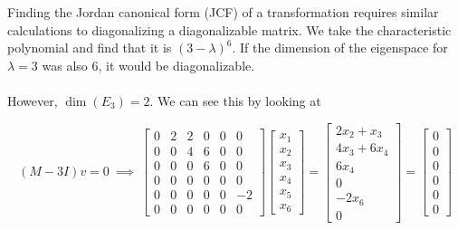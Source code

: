 \documentclass[fontsize=12pt]{scrartcl}
\begin{document}
\noindent
Finding the Jordan canonical form (JCF) of a transformation requires similar calculations to diagonalizing a diagonalizable matrix. We take the characteristic polynomial and find that it is $(3-\lambda)^6$. If the dimension of the eigenspace for $\lambda = 3$ was also 6, it would be diagonalizable.\\
\\
However, $\dim(E_3) = 2$. We can see this by looking at

$$(M- 3I)v = 0 \ \implies \  \begin{bmatrix} 0 & 2 & 2 & 0 & 0 & 0 \\
0 & 0 & 4 & 6 & 0 & 0\\
0 & 0 & 0 & 6 & 0 & 0\\
0 & 0 & 0 & 0 & 0 & 0\\
0 & 0 & 0 & 0 & 0 & -2\\
0 & 0 & 0 & 0 & 0 & 0\end{bmatrix} \begin{bmatrix} x_1 \\ x_2 \\ x_3 \\ x_4 \\ x_5 \\ x_6 \end{bmatrix} = \begin{bmatrix}  2x_2 + x_3 \\  4 x_3 + 6 x_4 \\  6x_4 \\ 0 \\  - 2x_6 \\ 0 \end{bmatrix} = \begin{bmatrix} 0 \\ 0 \\ 0 \\ 0 \\ 0 \\ 0 \end{bmatrix} $$
\end{document}
